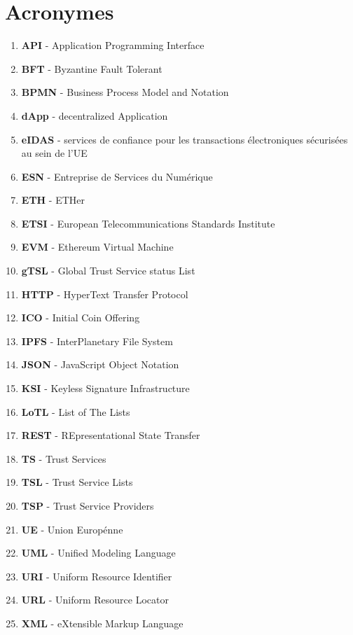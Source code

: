 \documentclass{tnreport}
\begin{document}
\chapter*{Acronymes}

\begin{enumerate}
	\item \textbf{API} - Application Programming Interface
	\item \textbf{BFT} - Byzantine Fault Tolerant
	\item \textbf{BPMN} - Business Process Model and Notation
	\item \textbf{dApp} - decentralized Application
	\item \textbf{eIDAS} - services de confiance pour les transactions électroniques sécurisées au sein de l'UE
	\item \textbf{ESN} - Entreprise de Services du Numérique
	\item \textbf{ETH} - ETHer
	\item \textbf{ETSI} - European Telecommunications Standards Institute
	\item \textbf{EVM} - Ethereum Virtual Machine
	\item \textbf{gTSL} - Global Trust Service status List
	\item \textbf{HTTP} - HyperText Transfer Protocol 
	\item \textbf{ICO} - Initial Coin Offering
	\item \textbf{IPFS} - InterPlanetary File System
	\item \textbf{JSON} - JavaScript Object Notation
	\item \textbf{KSI} - Keyless Signature Infrastructure
	\item \textbf{LoTL} - List of The Lists
	\item \textbf{REST} - REpresentational State Transfer
	\item \textbf{TS} - Trust Services
	\item \textbf{TSL} - Trust Service Lists
	\item \textbf{TSP} - Trust Service Providers
	\item \textbf{UE} - Union Europénne
	\item \textbf{UML} - Unified Modeling Language
	\item \textbf{URI} - Uniform Resource Identifier
	\item \textbf{URL} - Uniform Resource Locator
	\item \textbf{XML} - eXtensible Markup Language
\end{enumerate}
\end{document}
